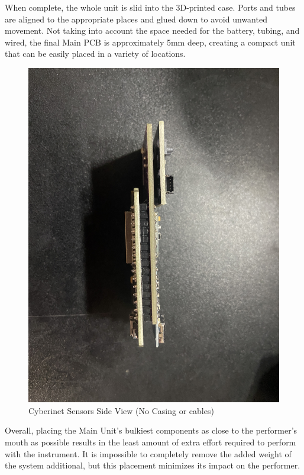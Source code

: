 When complete, the whole unit is slid into the 3D-printed case. Ports and tubes are aligned to the appropriate places and glued down to avoid unwanted movement. Not taking into account the space needed for the battery, tubing, and wired, the final Main PCB is approximately 5mm deep, creating a compact unit that can be easily placed in a variety of locations.

\begin{center}
    \begin{figure}
        \centering
        \includegraphics[scale=0.05]{diagrams/PCBs/cyberinetThin.JPG}
        \caption{Cyberinet Sensors Side View (No Casing or cables)}
        \label{fig:Cyberinetside}
    \end{figure}
\end{center}


Overall, placing the Main Unit's bulkiest components as close to the performer's mouth as possible results in the least amount of extra effort required to perform with the instrument. It is impossible to completely remove the added weight of the system additional, but this placement minimizes its impact on the performer.




